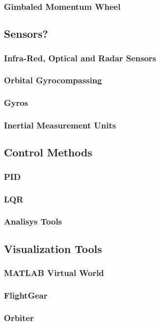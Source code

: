 \documentclass{article}
\begin{document}
\subsubsection{Gimbaled Momentum Wheel}
\subsection{Sensors?}
\subsubsection{Infra-Red, Optical and Radar Sensors}
\subsubsection{Orbital Gyrocompassing}
\subsubsection{Gyros}
\subsubsection{Inertial Measurement Units}
\subsection{Control Methods}
\subsubsection{PID}
\subsubsection{LQR}
\subsubsection{Analisys Tools}
\subsection{Visualization Tools}
\subsubsection{MATLAB Virtual World}
\subsubsection{FlightGear}
\subsubsection{Orbiter}
\end{document}

